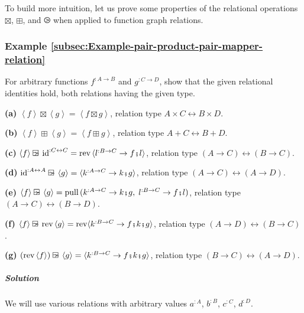 To build more intuition, let us prove some properties of the relational
operations $\boxtimes$, $\boxplus$, and $\ogreaterthan$ when applied
to function graph relations.

\subsubsection{Example \label{subsec:Example-pair-product-pair-mapper-relation}\ref{subsec:Example-pair-product-pair-mapper-relation}}

For arbitrary functions $f^{:A\rightarrow B}$ and $g^{:C\rightarrow D}$,
show that the given relational identities hold, both relations having
the given type.

\textbf{(a)} $\left<f\right>\boxtimes\left<g\right>=\left<f\boxtimes g\right>$,
relation type $A\times C\leftrightarrow B\times D$.

\textbf{(b)} $\left<f\right>\boxplus\left<g\right>=\left<f\boxplus g\right>$,
relation type $A+C\leftrightarrow B+D$.

\textbf{(c)} $\left<f\right>\ogreaterthan\text{id}^{:C\leftrightarrow C}=\text{rev}\,\langle l^{:B\rightarrow C}\rightarrow f\bef l\rangle$,
relation type $\left(A\rightarrow C\right)\leftrightarrow\left(B\rightarrow C\right)$.

\textbf{(d)} $\text{id}^{:A\leftrightarrow A}\ogreaterthan\left<g\right>=\langle k^{:A\rightarrow C}\rightarrow k\bef g\rangle$,
relation type $\left(A\rightarrow C\right)\leftrightarrow\left(A\rightarrow D\right)$.

\textbf{(e)} $\left<f\right>\ogreaterthan\left<g\right>=\text{pull}\,(k^{:A\rightarrow C}\rightarrow k\bef g,\;l^{:B\rightarrow C}\rightarrow f\bef l)$,
relation type $\left(A\rightarrow C\right)\leftrightarrow\left(B\rightarrow D\right)$.

\textbf{(f)} $\left<f\right>\ogreaterthan\text{rev}\left<g\right>=\text{rev}\langle k^{:B\rightarrow C}\rightarrow f\bef k\bef g\rangle$,
relation type $\left(A\rightarrow D\right)\leftrightarrow\left(B\rightarrow C\right)$.

\textbf{(g)} $(\text{rev}\left<f\right>)\ogreaterthan\left<g\right>=\langle k^{:B\rightarrow C}\rightarrow f\bef k\bef g\rangle$,
relation type $\left(B\rightarrow C\right)\leftrightarrow\left(A\rightarrow D\right)$.

\subparagraph{Solution}

We will use various relations with arbitrary values $a^{:A}$, $b^{:B}$,
$c^{:C}$, $d^{:D}$.


